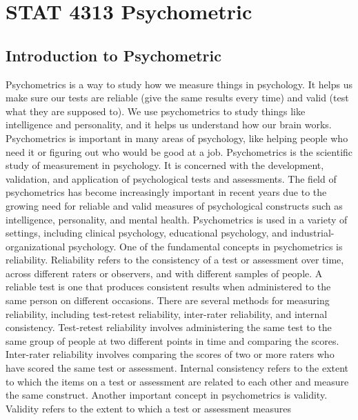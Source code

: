 \documentclass[
]{article}
\author{}
\date{}
\begin{document}
\hypertarget{stat-4313-psychometric}{%
\section{STAT 4313 Psychometric}\label{stat-4313-psychometric}}

\hypertarget{introduction-to-psychometric}{%
\subsection{Introduction to
Psychometric}\label{introduction-to-psychometric}}

Psychometrics is a way to study how we measure things in psychology. It
helps us make sure our tests are reliable (give the same results every
time) and valid (test what they are supposed to). We use psychometrics
to study things like intelligence and personality, and it helps us
understand how our brain works. Psychometrics is important in many areas
of psychology, like helping people who need it or figuring out who would
be good at a job. Psychometrics is the scientific study of measurement
in psychology. It is concerned with the development, validation, and
application of psychological tests and assessments. The field of
psychometrics has become increasingly important in recent years due to
the growing need for reliable and valid measures of psychological
constructs such as intelligence, personality, and mental health.
Psychometrics is used in a variety of settings, including clinical
psychology, educational psychology, and industrial-organizational
psychology. One of the fundamental concepts in psychometrics is
reliability. Reliability refers to the consistency of a test or
assessment over time, across different raters or observers, and with
different samples of people. A reliable test is one that produces
consistent results when administered to the same person on different
occasions. There are several methods for measuring reliability,
including test-retest reliability, inter-rater reliability, and internal
consistency. Test-retest reliability involves administering the same
test to the same group of people at two different points in time and
comparing the scores. Inter-rater reliability involves comparing the
scores of two or more raters who have scored the same test or
assessment. Internal consistency refers to the extent to which the items
on a test or assessment are related to each other and measure the same
construct. Another important concept in psychometrics is validity.
Validity refers to the extent to which a test or assessment measures
\end{document}
